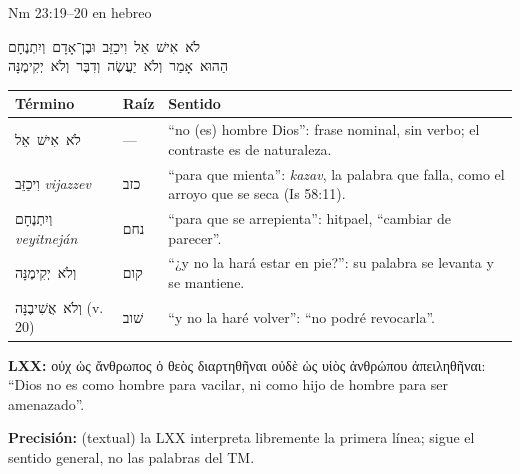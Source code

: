 \documentclass[hyperref={bookmarks=false},aspectratio=169]{beamer}
\newcommand{\heb}[1]{\mbox{\foreignlanguage{hebrew}{#1}}}
\newcommand{\grc}[1]{\foreignlanguage{ancientgreek}{#1}}
\newcommand{\precision}[1]{{\footnotesize\color{gris}\textbf{Precisión:} #1}}
\begin{document}
\begin{frame}{Nm 23:19--20 en hebreo}
\begin{center}\heb{לֹא אִישׁ אֵל וִיכַזֵּב וּבֶן־אָדָם וְיִתְנֶחָם}\\[2pt]\heb{הַהוּא אָמַר וְלֹא יַעֲשֶׂה וְדִבֶּר וְלֹא יְקִימֶנָּה}\end{center}
\scriptsize\renewcommand{\arraystretch}{1.13}
\begin{tabular}{@{}>{\RaggedRight\arraybackslash}p{2.9cm}>{\RaggedRight\arraybackslash}p{1.1cm}>{\RaggedRight\arraybackslash}p{7.9cm}@{}}
\toprule
\textbf{Término} & \textbf{Raíz} & \textbf{Sentido} \\ \midrule
\heb{לֹא אִישׁ אֵל} & --- & ``no (es) hombre Dios'': frase nominal, sin verbo; el contraste es de naturaleza. \\
\heb{וִיכַזֵּב} \emph{vijazzev} & \heb{כזב} & ``para que mienta'': \emph{kazav}, la palabra que falla, como el arroyo que se seca (Is 58:11). \\
\heb{וְיִתְנֶחָם} \emph{veyitneján} & \heb{נחם} & ``para que se arrepienta'': hitpael, ``cambiar de parecer''. \\
\heb{וְלֹא יְקִימֶנָּה} & \heb{קום} & ``¿y no la hará estar en pie?'': su palabra se levanta y se mantiene. \\
\heb{וְלֹא אֲשִׁיבֶנָּה} (v. 20) & \heb{שׁוב} & ``y no la haré volver'': ``no podré revocarla''. \\
\bottomrule
\end{tabular}\par\medskip
\small\textbf{LXX:} \grc{οὐχ ὡς ἄνθρωπος ὁ θεὸς διαρτηθῆναι οὐδὲ ὡς υἱὸς ἀνθρώπου ἀπειληθῆναι}: ``Dios no es como hombre para vacilar, ni como hijo de hombre para ser amenazado''.\par\smallskip
\precision{(textual) la LXX interpreta libremente la primera línea; sigue el sentido general, no las palabras del TM.}
\end{frame}
\end{document}
